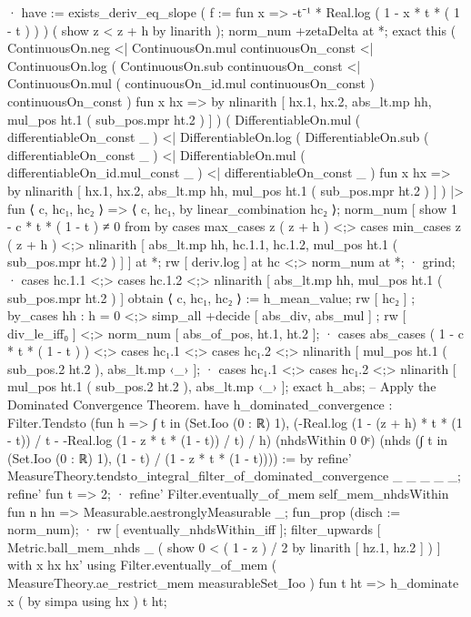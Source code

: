                 · have := exists_deriv_eq_slope ( f := fun x => -t⁻¹ * Real.log ( 1 - x * t * ( 1 - t ) ) ) ( show z < z + h by linarith );
                  norm_num +zetaDelta at *;
                  exact this ( ContinuousOn.neg <| ContinuousOn.mul continuousOn_const <| ContinuousOn.log ( ContinuousOn.sub continuousOn_const <| ContinuousOn.mul ( continuousOn_id.mul continuousOn_const ) continuousOn_const ) fun x hx => by nlinarith [ hx.1, hx.2, abs_lt.mp hh, mul_pos ht.1 ( sub_pos.mpr ht.2 ) ] ) ( DifferentiableOn.mul ( differentiableOn_const _ ) <| DifferentiableOn.log ( DifferentiableOn.sub ( differentiableOn_const _ ) <| DifferentiableOn.mul ( differentiableOn_id.mul_const _ ) <| differentiableOn_const _ ) fun x hx => by nlinarith [ hx.1, hx.2, abs_lt.mp hh, mul_pos ht.1 ( sub_pos.mpr ht.2 ) ] ) |> fun ⟨ c, hc₁, hc₂ ⟩ => ⟨ c, hc₁, by linear_combination hc₂ ⟩;
              norm_num [ show 1 - c * t * ( 1 - t ) ≠ 0 from by cases max_cases z ( z + h ) <;> cases min_cases z ( z + h ) <;> nlinarith [ abs_lt.mp hh, hc.1.1, hc.1.2, mul_pos ht.1 ( sub_pos.mpr ht.2 ) ] ] at *;
              rw [ deriv.log ] at hc <;> norm_num at *;
              · grind;
              · cases hc.1.1 <;> cases hc.1.2 <;> nlinarith [ abs_lt.mp hh, mul_pos ht.1 ( sub_pos.mpr ht.2 ) ]
            obtain ⟨ c, hc₁, hc₂ ⟩ := h_mean_value; rw [ hc₂ ] ; by_cases hh : h = 0 <;> simp_all +decide [ abs_div, abs_mul ] ;
            rw [ div_le_iff₀ ] <;> norm_num [ abs_of_pos, ht.1, ht.2 ];
            · cases abs_cases ( 1 - c * t * ( 1 - t ) ) <;> cases hc₁.1 <;> cases hc₁.2 <;> nlinarith [ mul_pos ht.1 ( sub_pos.2 ht.2 ), abs_lt.mp ‹_› ];
            · cases hc₁.1 <;> cases hc₁.2 <;> nlinarith [ mul_pos ht.1 ( sub_pos.2 ht.2 ), abs_lt.mp ‹_› ];
          exact h_abs;
        -- Apply the Dominated Convergence Theorem.
        have h_dominated_convergence : Filter.Tendsto (fun h => ∫ t in (Set.Ioo (0 : ℝ) 1), (-Real.log (1 - (z + h) * t * (1 - t)) / t - -Real.log (1 - z * t * (1 - t)) / t) / h) (nhdsWithin 0 {0}ᶜ) (nhds (∫ t in (Set.Ioo (0 : ℝ) 1), (1 - t) / (1 - z * t * (1 - t)))) := by
          refine' MeasureTheory.tendsto_integral_filter_of_dominated_convergence _ _ _ _ _;
          refine' fun t => 2;
          · refine' Filter.eventually_of_mem self_mem_nhdsWithin fun n hn => Measurable.aestronglyMeasurable _;
            fun_prop (disch := norm_num);
          · rw [ eventually_nhdsWithin_iff ];
            filter_upwards [ Metric.ball_mem_nhds _ ( show 0 < ( 1 - z ) / 2 by linarith [ hz.1, hz.2 ] ) ] with x hx hx' using Filter.eventually_of_mem ( MeasureTheory.ae_restrict_mem measurableSet_Ioo ) fun t ht => h_dominate x ( by simpa using hx ) t ht;

